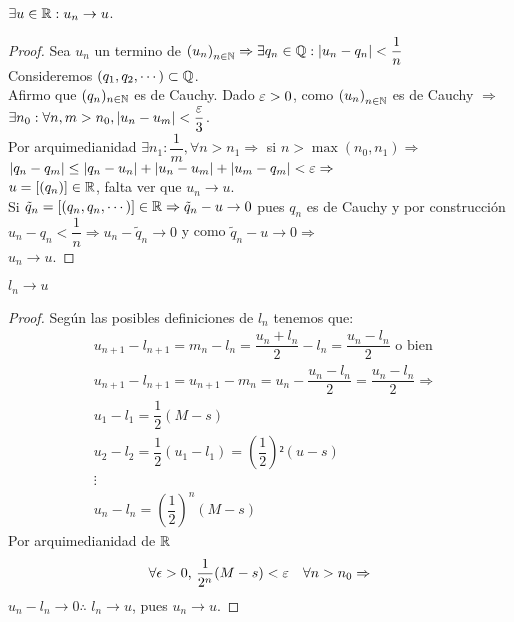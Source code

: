 \begin{lemma}
  \(\exists u \in \mathbb{R} : u_n \to u\).
  \begin{proof}
    Sea \(u_n\) un termino de \({(u_n)}_{n \in \mathbb{N}} \Rightarrow \exists q_n \in \mathbb{Q} : |u_n - q_n| < \dfrac{1}{n} \) \\
    Consideremos \((q_1, q_2, \cdots) \subset \mathbb{Q} \). \\
    Afirmo que \((q_n)_{n \in \mathbb{N}} \) es de Cauchy. Dado \(\varepsilon > 0\), como \({(u_n)}_{n \in \mathbb{N}} \) es de Cauchy \(\Rightarrow \) \\
    \(\exists n_0 : \forall n, m > n_0, |u_n - u_m| < \dfrac{\varepsilon}{3} \). \\
    Por arquimedianidad \(\exists n_1 : \dfrac{1}{m}, \forall n > n_1 \Rightarrow \) si \(n > \max(n_0, n_1) \Rightarrow \) \\
    \(|q_n - q_m| \leq |q_n - u_n| + |u_n - u_m| + |u_m - q_m| < \varepsilon \Rightarrow \) \\
    \(u = [(q_n)] \in \mathbb{R} \), falta ver que \(u_n \to u\). \\
    Si \(\tilde{q}_n = [(q_n, q_n, \cdots)] \in \mathbb{R} \Rightarrow \tilde{q}_n - u \to 0\) pues \(q_n\) es de Cauchy y por construcción \(u_n - q_n < \dfrac{1}{n} \Rightarrow u_n - \tilde{q}_n \to 0\) y como \(\tilde{q}_n - u \to 0 \Rightarrow \) \\
    \(u_n \to u\).
  \end{proof}
\end{lemma}

\begin{lemma}
  \(l_n \to u\)
  \begin{proof}
    Según las posibles definiciones de \(l_n\) tenemos que: \begin{align*}
       & u_{n+1} - l_{n+1} = m_n - l_n = \dfrac{u_n+l_n}{2} - l_n = \dfrac{u_n-l_n}{2} \text{ o bien }     \\
       & u_{n+1} - l_{n+1} = u_{n+1} - m_n = u_n - \dfrac{u_n - l_n}{2} = \dfrac{u_n - l_n}{2} \Rightarrow \\
       & u_1 - l_1 = \dfrac{1}{2} (M-s)                                                                    \\
       & u_2 - l_2 = \dfrac{1}{2} (u_1 - l_1) = (\dfrac{1}{2})² (u - s)                                    \\
       & \vdots                                                                                            \\
       & u_n - l_n = (\dfrac{1}{2})^n (M - s)
    \end{align*}
    Por arquimedianidad de \(\mathbb{R} \) \begin{align*}
      \forall \epsilon > 0\text{, } \dfrac{1}{2^n} (M - s) < \varepsilon \quad \forall n > n_0 \Rightarrow
    \end{align*}
    \(u_n - l_n \to 0 \therefore \) \(l_n \to u\), pues \(u_n \to u\).
  \end{proof}
\end{lemma}

